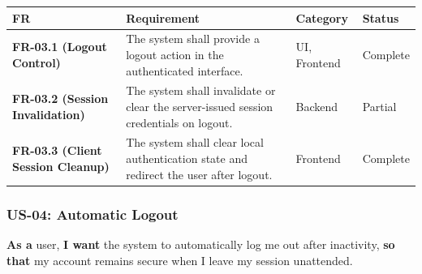 \documentclass[12pt]{article}
\renewcommand{\baselinestretch}{1.5}
\begin{document}
\begingroup
\small
\renewcommand{\baselinestretch}{1.0}\selectfont
\renewcommand{\arraystretch}{1.15}
\setlength{\tabcolsep}{6pt}
\begin{longtable}{|>{\raggedright\arraybackslash}p{}|>{\raggedright\arraybackslash}p{}|>{\raggedright\arraybackslash}p{}|>{\raggedright\arraybackslash}p{}|}
\hline
\textbf{FR} & \textbf{Requirement} & \textbf{Category} & \textbf{Status} \\ \hline
\endhead
\textbf{FR-03.1 (Logout Control)} & The system shall provide a logout action in the authenticated interface. & UI, Frontend & Complete \\ \hline
\textbf{FR-03.2 (Session Invalidation)} & The system shall invalidate or clear the server-issued session credentials on logout. & Backend & Partial \\ \hline
\textbf{FR-03.3 (Client Session Cleanup)} & The system shall clear local authentication state and redirect the user after logout. & Frontend & Complete \\ \hline
\end{longtable}
\endgroup
\par\medskip

\hypertarget{sec:us-04-automatic-logout}{}
\subsubsection*{US-04: Automatic Logout}
\par\medskip

\textbf{As a} user, \textbf{I want} the system to automatically log me out after inactivity, \textbf{so that} my account remains secure when I leave my session unattended.
\par\medskip
\end{document}
